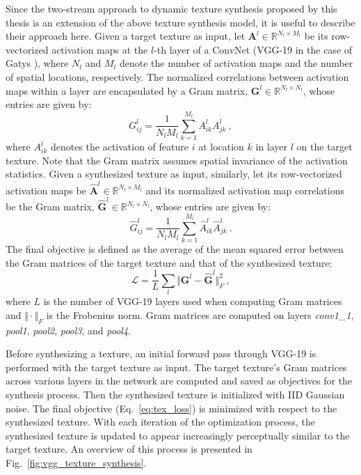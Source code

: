 Since the two-stream approach to dynamic texture synthesis proposed by this thesis is an extension of the above texture 
synthesis model, it is useful to describe their approach here. Given a target texture as input,
let $\mathbf{A}^{l} \in \mathbb{R}^{N_l\times M_l}$
be its row-vectorized activation maps at the $l$-th layer of a ConvNet (VGG-19 in the case of Gatys \etal \cite{gatys2015}), where $N_l$ and $M_l$ denote the number of
activation maps and the number of spatial locations,
respectively. The normalized correlations between activation maps
within a layer are encapsulated by a Gram matrix,
$\mathbf{G}^l \in \mathbb{R}^{N_l \times N_l}$, whose entries are given by:
\begin{equation}
	G_{ij}^l = \frac{1}{N_l M_l} \sum_{k=1}^{M_l} A_{ik}^l A_{jk}^l\ ,
\end{equation}
where $A_{ik}^l$ denotes the activation of feature $i$ at
location $k$ in layer $l$ on the target texture. Note that the Gram matrix assumes spatial invariance of the activation statistics.
Given a synthesized texture as input, similarly, let its row-vectorized activation maps
be $\hat{\mathbf{A}}^{l} \in \mathbb{R}^{N_l\times M_l}$ and its normalized
activation map correlations be the Gram matrix, $\hat{\mathbf{G}}^l \in \mathbb{R}^{N_l \times N_l}$, whose entries are given by:
\begin{equation}
	\hat{G}_{ij}^l = \frac{1}{N_l M_l} \sum_{k=1}^{M_l} \hat{A}_{ik}^l \hat{A}_{jk}^l\ .
\end{equation}
The final objective is defined as the average of the mean squared error between
the Gram matrices of the target texture and that of the synthesized texture:
\begin{equation}
   \mathcal{L} = \frac{1}{L} \sum_{l} \Vert \mathbf{G}^l - \hat{\mathbf{G}}^l \Vert^2_F\ ,
   \label{eq:tex_loss}
\end{equation}
where $L$ is the number of VGG-19 layers used when computing Gram matrices
and $\Vert \cdot \Vert_F$ is the Frobenius norm. Gram matrices are computed on
layers \emph{conv1\_1}, \emph{pool1}, \emph{pool2}, \emph{pool3}, and \emph{pool4}.

Before synthesizing a texture, an initial forward pass through VGG-19 is
performed with the target texture as input. The target texture's Gram matrices
across various layers in the network are computed and saved as objectives for
the synthesis process. Then the synthesized texture is initialized with IID
Gaussian noise. The final
objective (Eq.\ \ref{eq:tex_loss}) is minimized with respect to the synthesized texture. With each
iteration of the optimization process, the synthesized texture is updated to appear increasingly
perceptually similar to the target texture. An overview of this process is presented in Fig.\ \ref{fig:vgg_texture_synthesis}.
\clearpage

\clearpage


